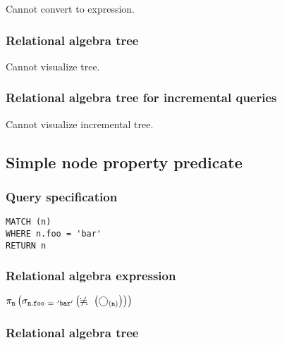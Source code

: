 Cannot convert to expression.

\subsubsection*{Relational algebra tree}

Cannot visualize tree.

\subsubsection*{Relational algebra tree for incremental queries}

Cannot visualize incremental tree.

\subsection{Simple node property predicate}

\subsubsection*{Query specification}

\begin{lstlisting}
MATCH (n)
WHERE n.foo = 'bar'
RETURN n
\end{lstlisting}

\subsubsection*{Relational algebra expression}

$\projection{\var{n}} \left(\selection{\mathtt{n.foo~=~'bar'}} \left(\alldifferent{} \left(\getvertices{n}{}\right)\right)\right)$

\subsubsection*{Relational algebra tree}


